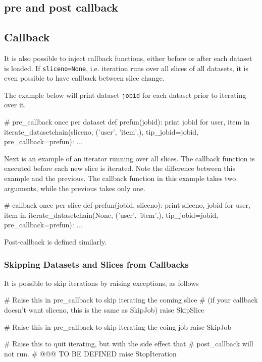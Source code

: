
    


\subsection{pre and post callback}
\subsection{Callback}
\label{sec:callback}

It is also possible to inject callback functions, either before or
after each dataset is loaded.  If \texttt{sliceno=None},
i.e. iteration runs over all slices of all datasets, it is even
possible to have callback between slice change.

The example below will print dataset \texttt{jobid} for each dataset
prior to iterating over it.

\begin{python}
# pre_callback once per dataset
def prefun(jobid):
    print jobid
for user, item in iterate_datasetchain(sliceno, ('user', 'item',), tip_jobid=jobid,
                                       pre_callback=prefun):
    ...
\end{python}

\noindent Next is an example of an iterator running over all slices.
The callback function is executed before each new slice is iterated.
Note the difference between this example and the previous.  The
callback function in this example takes two arguments, while the
previous takes only one.

\begin{python}
# callback once per slice
def prefun(jobid, sliceno):
    print sliceno, jobid
for user, item in iterate_datasetchain(None, ('user', 'item',), tip_jobid=jobid,
                                       pre_callback=prefun):
    ...
\end{python}
\noindent Post-callback is defined similarly.



\subsubsection*{Skipping Datasets and Slices from Callbacks}
It is possible to skip iterations by raising exceptions, as follows

\begin{python}

# Raise this in pre_callback to skip iterating the coming slice
# (if your callback doesn't want sliceno, this is the same as SkipJob)
raise SkipSlice

# Raise this in pre_callback to skip iterating the coing job
raise SkipJob

# Raise this to quit iterating, but with the side effect that
# post_callback will not run.
# @@@ TO BE DEFINED
raise StopIteration
\end{python}
